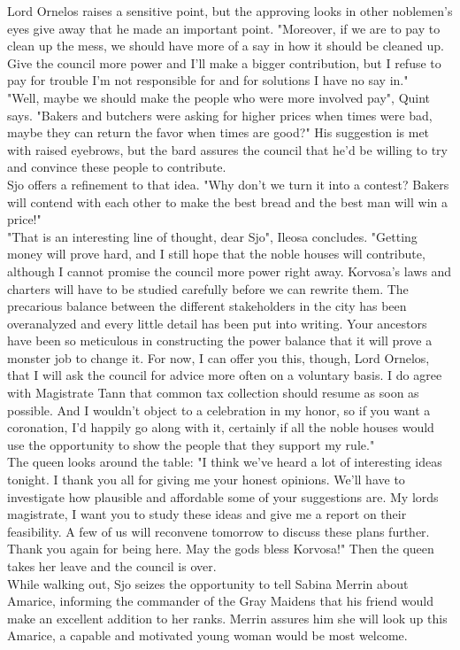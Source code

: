 Lord Ornelos raises a sensitive point, but the approving looks in other noblemen's eyes give away that he made an important point. "Moreover, if we are to pay to clean up the mess, we should have more of a say in how it should be cleaned up. Give the council more power and I'll make a bigger contribution, but I refuse to pay for trouble I'm not responsible for and for solutions I have no say in."\\

"Well, maybe we should make the people who were more involved pay", Quint says. "Bakers and butchers were asking for higher prices when times were bad, maybe they can return the favor when times are good?" His suggestion is met with raised eyebrows, but the bard assures the council that he'd be willing to try and convince these people to contribute.\\

Sjo offers a refinement to that idea. "Why don't we turn it into a contest? Bakers will contend with each other to make the best bread and the best man will win a price!"\\

"That is an interesting line of thought, dear Sjo", Ileosa concludes. "Getting money will prove hard, and I still hope that the noble houses will contribute, although I cannot promise the council more power right away. Korvosa's laws and charters will have to be studied carefully before we can rewrite them. The precarious balance between the different stakeholders in the city has been overanalyzed and every little detail has been put into writing. Your ancestors have been so meticulous in constructing the power balance that it will prove a monster job to change it. For now, I can offer you this, though, Lord Ornelos, that I will ask the council for advice more often on a voluntary basis. I do agree with Magistrate Tann that common tax collection should resume as soon as possible. And I wouldn't object to a celebration in my honor, so if you want a coronation, I'd happily go along with it, certainly if all the noble houses would use the opportunity to show the people that they support my rule."\\

The queen looks around the table: "I think we've heard a lot of interesting ideas tonight. I thank you all for giving me your honest opinions. We'll have to investigate how plausible and affordable some of your suggestions are. My lords magistrate, I want you to study these ideas and give me a report on their feasibility. A few of us will reconvene tomorrow to discuss these plans further. Thank you again for being here. May the gods bless Korvosa!" Then the queen takes her leave and the council is over.\\

While walking out, Sjo seizes the opportunity to tell Sabina Merrin about Amarice, informing the commander of the Gray Maidens that his friend would make an excellent addition to her ranks. Merrin assures him she will look up this Amarice, a capable and motivated young woman would be most welcome.\\

